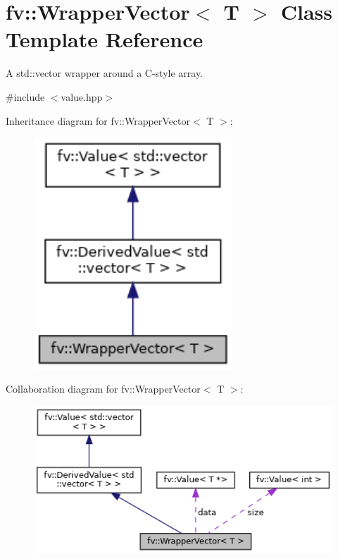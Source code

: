\hypertarget{classfv_1_1WrapperVector}{}\section{fv\+:\+:Wrapper\+Vector$<$ T $>$ Class Template Reference}
\label{classfv_1_1WrapperVector}


A std\+::vector wrapper around a C-\/style array.  




{\ttfamily \#include $<$value.\+hpp$>$}



Inheritance diagram for fv\+:\+:Wrapper\+Vector$<$ T $>$\+:
\nopagebreak
\begin{figure}[H]
\begin{center}
\leavevmode
\includegraphics[width=211pt]{classfv_1_1WrapperVector__inherit__graph}
\end{center}
\end{figure}


Collaboration diagram for fv\+:\+:Wrapper\+Vector$<$ T $>$\+:
\nopagebreak
\begin{figure}[H]
\begin{center}
\leavevmode
\includegraphics[width=350pt]{classfv_1_1WrapperVector__coll__graph}
\end{center}
\end{figure}
